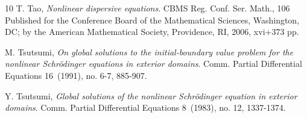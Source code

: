 \documentclass[11pt,letter]{amsart}
\numberwithin{equation}{section}
\numberwithin{equation}{section}
\begin{document}
\begin{thebibliography}{10}
T. Tao,  \emph{ Nonlinear dispersive equations}.
CBMS Reg. Conf. Ser. Math., 106
Published for the Conference Board of the Mathematical Sciences, Washington, DC; by the American Mathematical Society, Providence, RI, 2006, xvi+373 pp.


M. Tsutsumi, \emph{
On global solutions to the initial-boundary value problem for the nonlinear Schr\"odinger equations in exterior domains}.
Comm. Partial Differential Equations 16~(1991), no. 6-7, 885-907.

Y. Tsutsumi, \emph{
Global solutions of the nonlinear Schr\"odinger equation in exterior domains}.
Comm. Partial Differential Equations 8~(1983), no. 12, 1337-1374.

\end{thebibliography}
\end{document}
